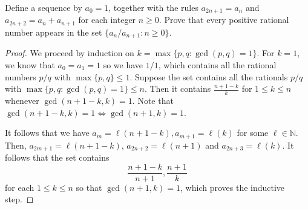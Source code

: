 \documentclass[11pt]{scrartcl}
\newcommand{\N}{\mathbb{N}}
\newcommand{\<}{\langle}
\renewcommand{\>}{\rangle}
\begin{document}
Define a sequence by $a_0 = 1$, together with the rules $a_{2n+1} = a_n$ and $a_{2n+2} = a_n + a_{n+1}$ for each integer $n \ge 0$.  Prove that every positive rational number appears in the set $\{a_n/a_{n+1}: n \ge 0\}$.

\begin{proof}
We proceed by induction on $k = \max\{p, q: \gcd(p, q) = 1\}$.  For $k = 1$, we know that $a_0 = a_1 = 1$ so we have $1/1$, which contains all the rational numbers $p/q$ with $\max\{p, q\} \le 1$.  Suppose the set contains all the rationals $p/q$ with $\max\{p, q: \gcd(p, q) = 1\} \le n$.  Then it contains $\frac{n+1-k}{k}$ for $1 \le k \le n$ whenever $\gcd(n+1-k, k) = 1$.  Note that $\gcd(n+1 - k, k) = 1 \Leftrightarrow \gcd(n+1, k) = 1$.

It follows that we have $a_m = \ell(n + 1 - k), a_{m+1} = \ell(k)$ for some $\ell \in \N$.  Then, $a_{2m+1} = \ell(n+1-k)$, $a_{2n+2} = \ell(n+1)$ and $a_{2n+3} = \ell(k)$.  It follows that the set contains 
$$\frac{n+1-k}{n+1}, \frac{n+1}{k}$$
for each $1 \le k\le n$ so that $\gcd(n+1, k) = 1$, which proves the inductive step.  
\end{proof}
\end{document}

